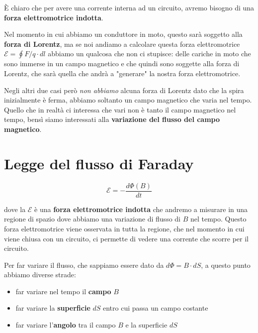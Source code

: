 È chiaro che per avere una corrente interna ad un circuito, avremo bisogno di una \textbf{forza elettromotrice indotta}. 

Nel momento in cui abbiamo un conduttore in moto, questo sarà soggetto alla \textbf{forza di Lorentz}, ma se noi andiamo a calcolare questa forza elettromotrice $\mathcal{E} = \oint F/q \cdot dl$ abbiamo un qualcosa che non ci stupisce: delle cariche in moto che sono immerse in un campo magnetico e che quindi sono soggette alla forza di Lorentz, che sarà quella che andrà a "generare" la nostra forza elettromotrice. 

Negli altri due casi però \textit{non abbiamo} alcuna forza di Lorentz dato che la spira inizialmente è ferma, abbiamo soltanto un campo magnetico che varia nel tempo. Quello che in realtà ci interessa che vari non è tanto il campo magnetico nel tempo, bensì siamo interessati alla \textbf{variazione del flusso del campo magnetico}. 

\section{Legge del flusso di Faraday}

\begin{tcolorbox}[colframe=red, colback=red!10, title=Legge di Faraday]
	\begin{large}
		\begin{equation}
			\mathcal{E} = -\frac{d\Phi(B)}{dt}
		\end{equation}
	\end{large}
\end{tcolorbox}

dove la $\mathcal{E}$ è una \textbf{forza elettromotrice indotta} che andremo a misurare in una regione di spazio dove abbiamo una variazione di flusso di $B$ nel tempo. Questo forza elettromotrice viene osservata in tutta la regione, che nel momento in cui viene chiusa con un circuito, ci permette di vedere una corrente che scorre per il circuito. 

Per far variare il flusso, che sappiamo essere dato da $d\Phi = B \cdot dS$, a questo punto abbiamo diverse strade: 

\begin{itemize}
	\item far variare nel tempo il \textbf{campo} $B$
	\item far variare la \textbf{superficie} $dS$ entro cui passa un campo costante
	\item far variare l'\textbf{angolo} tra il campo $B$ e la superficie $dS$
\end{itemize}

